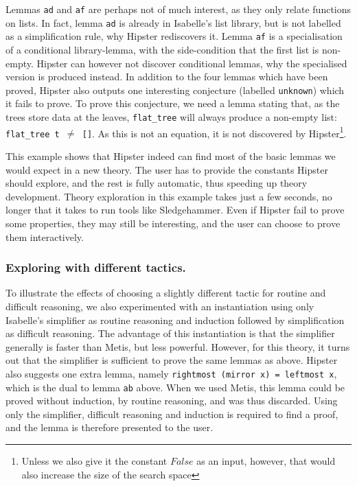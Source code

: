 Lemmas \texttt{ad} and \texttt{af} are perhaps not of much interest, as they only relate functions on lists. In fact, lemma \texttt{ad} is already in Isabelle's list library, but is not labelled as a simplification rule, why Hipster rediscovers it. Lemma \texttt{af} is a specialisation of a conditional library-lemma, with the side-condition that the first list is non-empty. Hipster can however not discover conditional lemmas, why the specialised version is produced instead. In addition to the four lemmas which have been proved, Hipster also outputs one interesting conjecture (labelled \texttt{unknown}) which it fails to prove. To prove this conjecture, we need a lemma stating that, as the trees store data at the leaves, \texttt{flat\_tree} will always produce a non-empty list:\\
 \texttt{flat\_tree t $\neq$ []}. As this is not an equation, it is not discovered by Hipster\footnote{Unless we also give it the constant $False$ as an input, however, that would also increase the size of the search space}. 
 
This example shows that Hipster indeed can find most of the basic lemmas we would expect in a new theory. The user has to provide the constants Hipster should explore, and the rest is fully automatic, thus speeding up theory development.  Theory exploration in this example takes just a few seconds, no longer that it takes to run tools like Sledgehammer. Even if Hipster fail to prove some properties, they may still be interesting, and the user can choose to prove them interactively.

\subsubsection*{Exploring with different tactics.}
To illustrate the effects of choosing a slightly different tactic for routine and difficult reasoning, we also experimented with an instantiation using only Isabelle's simplifier as routine reasoning and induction followed by simplification as difficult reasoning. The advantage of this instantiation is that the simplifier generally is faster than Metis, but less powerful. However, for this theory, it turns out that the simplifier is sufficient to prove the same lemmas as above. Hipster also suggests one extra lemma, namely \texttt{rightmost (mirror x) = leftmost x}, which is the dual to lemma \texttt{ab} above. When we used Metis, this lemma could be proved without induction, by routine reasoning, and was thus discarded. Using only the simplifier, difficult reasoning and induction is required to find a proof, and the lemma is therefore presented to the user. 

